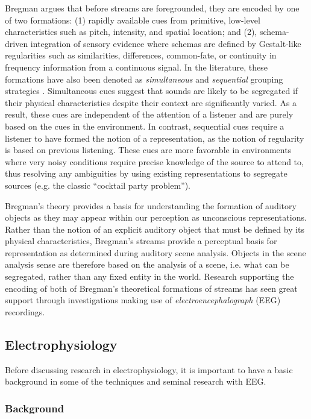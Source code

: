 Bregman argues that before streams are foregrounded, they are encoded by one of two formations: (1) rapidly available cues from primitive, low-level characteristics such as pitch, intensity, and spatial location; and (2), schema-driven integration of sensory evidence where schemas are defined by Gestalt-like regularities such as similarities, differences, common-fate, or continuity in frequency information from a continuous signal.  In the literature, these formations have also been denoted as \textit{simultaneous} and \textit{sequential} grouping strategies \cite{Winkler2009a}.  Simultaneous cues suggest that sounds are likely to be segregated if their physical characteristics despite their context are significantly varied.  As a result, these cues are independent of the attention of a listener and are purely based on the cues in the environment.  In contrast, sequential cues require a listener to have formed the notion of a representation, as the notion of regularity is based on previous listening.  These cues are more favorable in environments where very noisy conditions require precise knowledge of the source to attend to, thus resolving any ambiguities by using existing representations to segregate sources (e.g. the classic ``cocktail party problem'').  

Bregman's theory provides a basis for understanding the formation of auditory objects as they may appear within our perception as unconscious representations.  Rather than the notion of an explicit auditory object that must be defined by its physical characteristics, Bregman's streams provide a perceptual basis for representation as determined during auditory scene analysis.  Objects in the scene analysis sense are therefore based on the analysis of a scene, i.e. what can be segregated, rather than any fixed entity in the world.  Research supporting the encoding of both of Bregman's theoretical formations of streams has seen great support through investigations making use of \textit{electroencephalograph} (EEG) recordings.  

\subsection{Electrophysiology}

Before discussing research in electrophysiology, it is important to have a basic background in some of the techniques and seminal research with EEG.  

\subsubsection{Background}

